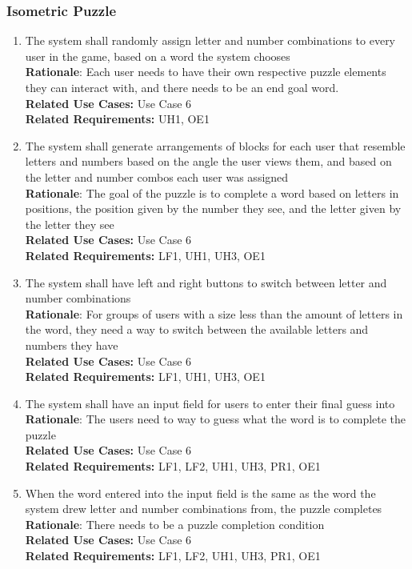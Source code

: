 \documentclass[12pt]{article}
\begin{document}
\subsubsection{Isometric Puzzle}

\begin{enumerate}[label=IP\arabic*., series=IsometricPuzzle ]
        \item The system shall randomly assign letter and number combinations to every user in the game, based on a word the system chooses \\
        \textbf{Rationale}: Each user needs to have their own respective puzzle elements they can interact with, and there needs to be an end goal word. \\
        \textbf{Related Use Cases:} Use Case 6\\
        \textbf{Related Requirements:} UH1, OE1
        \item The system shall generate arrangements of blocks for each user that resemble letters and numbers based on the angle the user views them, and based on the letter and number combos each user was assigned \\
        \textbf{Rationale}: The goal of the puzzle is to complete a word based on letters in positions, the position given by the number they see, and the letter given by the letter they see\\
        \textbf{Related Use Cases:} Use Case 6\\
        \textbf{Related Requirements:} LF1, UH1, UH3, OE1
        \item The system shall have left and right buttons to switch between letter and number combinations \\
        \textbf{Rationale}: For groups of users with a size less than the amount of letters in the word, they need a way to switch between the available letters and numbers they have\\
        \textbf{Related Use Cases:} Use Case 6\\
        \textbf{Related Requirements:} LF1, UH1, UH3, OE1
        \item The system shall have an input field for users to enter their final guess into \\
        \textbf{Rationale}: The users need to way to guess what the word is to complete the puzzle\\
        \textbf{Related Use Cases:} Use Case 6\\
        \textbf{Related Requirements:} LF1, LF2, UH1, UH3, PR1, OE1
        \item When the word entered into the input field is the same as the word the system drew letter and number combinations from, the puzzle completes\\
        \textbf{Rationale}: There needs to be a puzzle completion condition\\
        \textbf{Related Use Cases:} Use Case 6\\
        \textbf{Related Requirements:} LF1, LF2, UH1, UH3, PR1, OE1
\end{enumerate}
\end{document}
